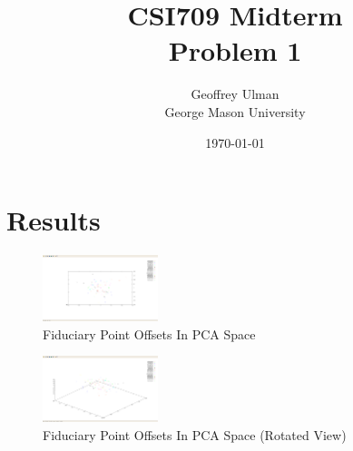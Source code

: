 \documentclass[12pt]{article}
\begin{document}
\title{CSI709 Midterm \\
Problem 1}
\author{
        Geoffrey Ulman \\
        George Mason University\\
}
\date{\today}

\maketitle

\section{Results}

\begin{figure}
\centering
\includegraphics[width=0.30\textwidth]{problem1-fid-pca-1.png}
\caption{Fiduciary Point Offsets In PCA Space}
\label{pca1}
\end{figure}

\begin{figure}
\centering
\includegraphics[width=0.30\textwidth]{problem1-fid-pca-2.png}
\caption{Fiduciary Point Offsets In PCA Space (Rotated View)}
\label{pca1}
\end{figure}
\end{document}
